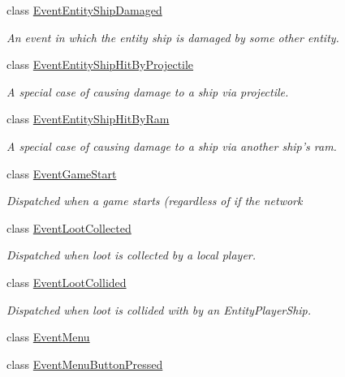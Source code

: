 \begin{DoxyCompactItemize}
class \hyperlink{class_skyrates_1_1_game_1_1_event_1_1_event_entity_ship_damaged}{Event\-Entity\-Ship\-Damaged}
\begin{DoxyCompactList}\small\item\em An event in which the entity ship is damaged by some other entity. \end{DoxyCompactList}\item 
class \hyperlink{class_skyrates_1_1_game_1_1_event_1_1_event_entity_ship_hit_by_projectile}{Event\-Entity\-Ship\-Hit\-By\-Projectile}
\begin{DoxyCompactList}\small\item\em A special case of causing damage to a ship via projectile. \end{DoxyCompactList}\item 
class \hyperlink{class_skyrates_1_1_game_1_1_event_1_1_event_entity_ship_hit_by_ram}{Event\-Entity\-Ship\-Hit\-By\-Ram}
\begin{DoxyCompactList}\small\item\em A special case of causing damage to a ship via another ship's ram. \end{DoxyCompactList}\item 
class \hyperlink{class_skyrates_1_1_game_1_1_event_1_1_event_game_start}{Event\-Game\-Start}
\begin{DoxyCompactList}\small\item\em Dispatched when a game starts (regardless of if the network \end{DoxyCompactList}\item 
class \hyperlink{class_skyrates_1_1_game_1_1_event_1_1_event_loot_collected}{Event\-Loot\-Collected}
\begin{DoxyCompactList}\small\item\em Dispatched when loot is collected by a local player. \end{DoxyCompactList}\item 
class \hyperlink{class_skyrates_1_1_game_1_1_event_1_1_event_loot_collided}{Event\-Loot\-Collided}
\begin{DoxyCompactList}\small\item\em Dispatched when loot is collided with by an Entity\-Player\-Ship. \end{DoxyCompactList}\item 
class \hyperlink{class_skyrates_1_1_game_1_1_event_1_1_event_menu}{Event\-Menu}
\item 
class \hyperlink{class_skyrates_1_1_game_1_1_event_1_1_event_menu_button_pressed}{Event\-Menu\-Button\-Pressed}

\end{DoxyCompactItemize}
